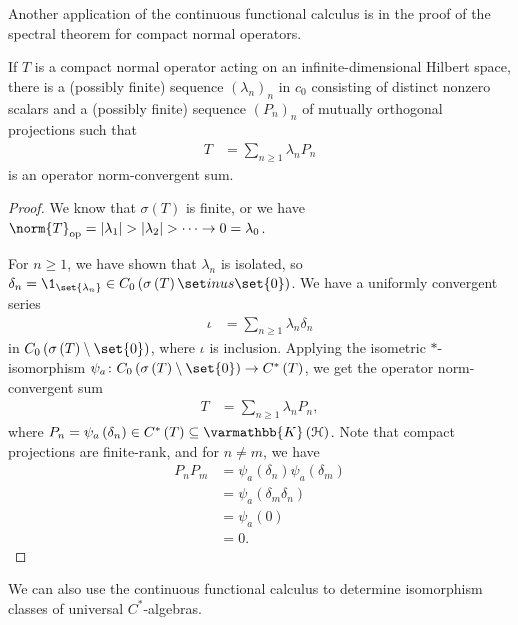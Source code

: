\documentclass[10pt]{mypackage}
\renewcommand*{\mathbb}[1]{\varmathbb{#1}}
\newcommand{\K}{\mathbb{K}}
\DeclareMathOperator{\op}{op}
\begin{document}
Another application of the continuous functional calculus is in the proof of the spectral theorem for compact normal operators.
\begin{theorem}
  If $T$ is a compact normal operator acting on an infinite-dimensional Hilbert space, there is a (possibly finite) sequence $\left(\lambda_n\right)_n$ in $c_0$ consisting of distinct nonzero scalars and a (possibly finite) sequence $\left(P_n\right)_n$ of mutually orthogonal projections such that
  \begin{align*}
    T &= \sum_{n\geq 1}\lambda_nP_n
  \end{align*}
  is an operator norm-convergent sum.
\end{theorem}
\begin{proof}
  We know that $\sigma(T)$ is finite, or we have $\norm{T}_{\op} = \left\vert \lambda_1 \right\vert > \left\vert \lambda_2 \right\vert > \cdots \rightarrow 0 = \lambda_0$.\newline

  For $n\geq 1$, we have shown that $\lambda_n$ is isolated, so $\delta_n = \1_{\set{\lambda_n}}\in C_0\left(\sigma\left(T\right)\set inus \set{0}\right)$. We have a uniformly convergent series
  \begin{align*}
    \iota &= \sum_{n\geq 1}\lambda_n\delta_n
  \end{align*}
  in $C_0\left(\sigma\left(T\right)\setminus \set{0}\right)$, where $\iota$ is inclusion. Applying the isometric $\ast$-isomorphism $\psi_a\colon C_0\left(\sigma\left(T\right)\setminus \set{0}\right)\rightarrow C^{\ast}\left(T\right)$, we get the operator norm-convergent sum
  \begin{align*}
    T &= \sum_{n\geq 1}\lambda_nP_n,
  \end{align*}
  where $P_n = \psi_a\left(\delta_n\right)\in C^{\ast}\left(T\right)\subseteq \K\left(\mathcal{H}\right)$. Note that compact projections are finite-rank, and for $n\neq m$, we have
  \begin{align*}
    P_nP_m &= \psi_a\left(\delta_n\right)\psi_a\left(\delta_m\right)\\
           &= \psi_a\left(\delta_{m}\delta_n\right)\\
           &= \psi_a\left(0\right)\\
           &= 0.
  \end{align*}
\end{proof}
We can also use the continuous functional calculus to determine isomorphism classes of universal $C^{\ast}$-algebras.
\end{document}
